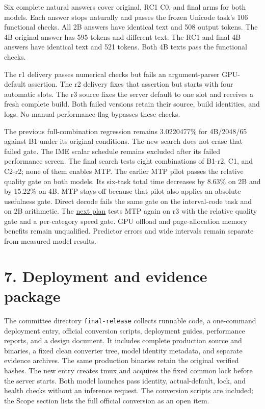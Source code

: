 \documentclass[10pt,a4paper]{article}
\begin{document}
Six complete natural answers cover original, RC1 C0, and final arms for
both models. Each answer stops naturally and passes the frozen Unicode
task's 106 functional checks. All 2B answers have identical text and 508
output tokens. The 4B original answer has 595 tokens and different text.
The RC1 and final 4B answers have identical text and 521 tokens. Both 4B
texts pass the functional checks.

The r1 delivery passes numerical checks but fails an argument-parser
GPU-default assertion. The r2 delivery fixes that assertion but starts
with four automatic slots. The r3 source fixes the server default to one
slot and receives a fresh complete build. Both failed versions retain
their source, build identities, and logs. No manual performance flag
bypasses these checks.

The previous full-combination regression remains 3.0220477\% for
4B/2048/65 against B1 under its original conditions. The new search does
not erase that failed gate. The IME scalar schedule remains excluded
after its failed performance screen. The final search tests eight
combinations of B1-r2, C1, and C2-r2; none of them enables MTP. The
earlier MTP pilot passes the relative quality gate on both models. Its
six-task total time decreases by 8.63\% on 2B and by 15.22\% on 4B. MTP
stays off because that pilot also applies an absolute usefulness gate.
Direct decode fails the same gate on the interval-code task and on 2B
arithmetic. The
\href{https://github.com/MoyaMryia/riscv-accl/blob/main/spacemit/reports/2026-10-16-next-plan.md}{next
plan} tests MTP again on r3 with the relative quality gate and a
per-category speed gate. GPU offload and page-allocation memory benefits
remain unqualified. Predictor errors and wide intervals remain separate
from measured model results.

\hypertarget{deployment-and-evidence-package}{%
\section{7. Deployment and evidence
package}\label{deployment-and-evidence-package}}

The committee directory \nolinkurl{final-release} collects runnable
code, a one-command deployment entry, official conversion scripts,
deployment guides, performance reports, and a design document. It
includes complete production source and binaries, a fixed clean
converter tree, model identity metadata, and separate evidence archives.
The same production binaries retain the original verified hashes. The
new entry creates tmux and acquires the fixed common lock before the
server starts. Both model launches pass identity, actual-default, lock,
and health checks without an inference request. The conversion scripts
are included; the Scope section lists the full official conversion as an
open item.
\end{document}
